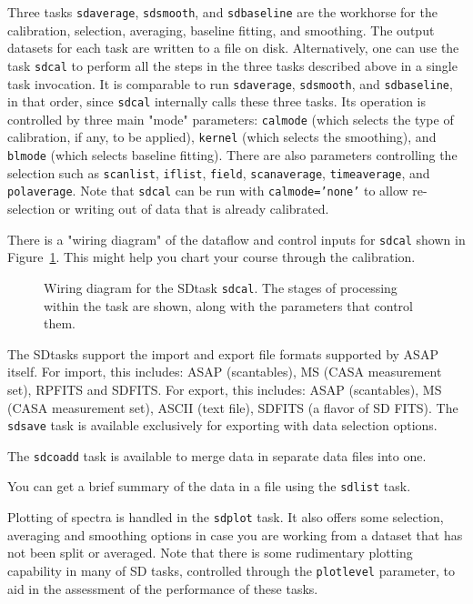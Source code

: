 Three tasks {\tt sdaverage}, {\tt sdsmooth}, and {\tt sdbaseline} are the
workhorse for the calibration, selection,
averaging, baseline fitting, and smoothing. The output datasets for
each task are written to a file on disk.
Alternatively, one can use the task {\tt sdcal} to perform all the steps in
the three tasks described above in a single task invocation. It is comparable 
to run {\tt sdaverage}, {\tt sdsmooth}, and {\tt sdbaseline}, in that order, since
{\tt sdcal} internally calls these three tasks. 
Its operation is
controlled by three main "mode" parameters: {\tt calmode} (which selects
the type of calibration, if any, to be applied), {\tt kernel} (which selects
the smoothing), and {\tt blmode} (which selects baseline fitting).  There
are also parameters controlling the selection such as {\tt scanlist}, 
{\tt iflist}, {\tt field}, {\tt scanaverage}, {\tt timeaverage}, and
{\tt polaverage}.  Note that {\tt sdcal} can be
run with {\tt calmode='none'} to allow re-selection or writing out of data
that is already calibrated.

There is a "wiring diagram" of the dataflow and control inputs for
{\tt sdcal} shown in Figure~\ref{fig:sdcal}.  This might help 
you chart your course through the calibration.

\begin{figure}[h!]
\begin{center}
\caption{\label{fig:sdcal} Wiring diagram for the SDtask {\tt sdcal}.
The stages of processing within the task are shown, along with the
parameters that control them. }
\hrulefill
\end{center}
\end{figure}

The SDtasks support the import and export file formats supported
by ASAP itself.  For import, this includes:  ASAP (scantables), 
MS (CASA measurement set), RPFITS and SDFITS.  For export, this
includes: ASAP (scantables), MS (CASA measurement set),
ASCII (text file), SDFITS (a flavor of SD FITS).
The {\tt sdsave} task is available exclusively for exporting with 
data selection options.

The {\tt sdcoadd} task is available to merge data in separate data files
into one.

You can get a brief summary of the data in a file using the {\tt sdlist}
task.

Plotting of spectra is handled in the {\tt sdplot} task.  It also offers
some selection, averaging and smoothing options in case you are
working from a dataset that has not been split or averaged.  Note that
there is some rudimentary plotting capability in many of SD 
tasks, controlled through the {\tt plotlevel} parameter, 
to aid in the assessment of the performance of these tasks.

